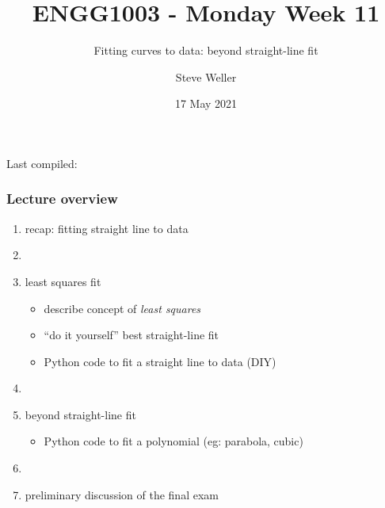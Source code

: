 \documentclass[english,14pt]{beamer}
\title{ENGG1003 - Monday Week 11}
\subtitle{Fitting curves to data: beyond straight-line fit}
\author{Steve Weller}
\institute{University of Newcastle}
\date{17 May 2021}
\begin{document}
\begin{flushleft}
{\scriptsize Last compiled:~\DTMnow}
\vspace*{-5mm}
\end{flushleft}
\framebreak


\begin{frame}[fragile]

\frametitle{Lecture overview}
\begin{enumerate}
	\item recap: fitting straight line to data
	\item[]
	\item least squares fit
		\begin{itemize}
			\item describe concept of \emph{least squares}
			\item ``do it yourself'' best straight-line fit
			\item Python code to fit a straight line to data (DIY)
		\end{itemize}	
	\item[]
	\item beyond straight-line fit
		\begin{itemize}
			\item Python code to fit a polynomial (eg: parabola, cubic)
		\end{itemize}	
	\item[]
	\item preliminary discussion of the final exam
\end{enumerate}

\end{frame}

\end{document}
